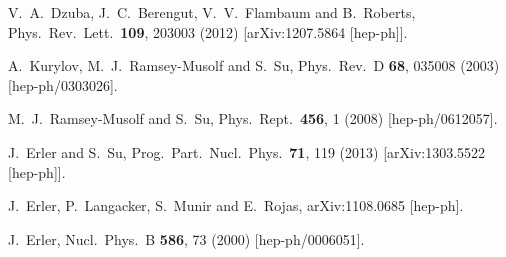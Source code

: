 \begin{thebibliography}{99}
  V.~A.~Dzuba, J.~C.~Berengut, V.~V.~Flambaum and B.~Roberts,
  Phys.\ Rev.\ Lett.\  {\bf 109}, 203003 (2012)
  [arXiv:1207.5864 [hep-ph]].

  A.~Kurylov, M.~J.~Ramsey-Musolf and S.~Su,
  Phys.\ Rev.\ D {\bf 68}, 035008 (2003)
  [hep-ph/0303026].

  M.~J.~Ramsey-Musolf and S.~Su,
  Phys.\ Rept.\  {\bf 456}, 1 (2008)
  [hep-ph/0612057].

  J.~Erler and S.~Su,
  Prog.\ Part.\ Nucl.\ Phys.\  {\bf 71}, 119 (2013)
  [arXiv:1303.5522 [hep-ph]].

  J.~Erler, P.~Langacker, S.~Munir and E.~Rojas,
  arXiv:1108.0685 [hep-ph].

  J.~Erler,
  Nucl.\ Phys.\ B {\bf 586}, 73 (2000)
  [hep-ph/0006051].




\end{thebibliography}